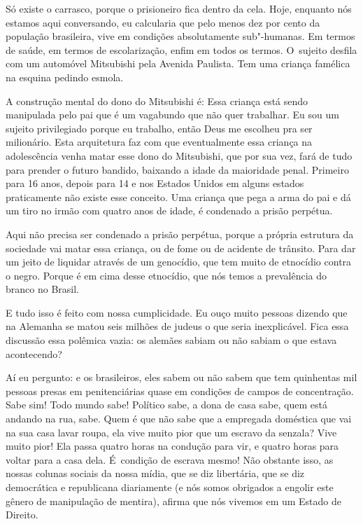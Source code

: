  

Só existe o carrasco, porque o prisioneiro fica dentro da cela. Hoje,
enquanto nós estamos aqui conversando, eu calcularia que pelo menos dez
por cento da população brasileira, vive em condições absolutamente
sub"-humanas. Em termos de saúde, em termos de escolarização, enfim em
todos os termos. O~sujeito desfila com um automóvel Mitsubishi pela
Avenida Paulista. Tem uma criança famélica na esquina pedindo esmola.

 

A construção mental do dono do Mitsubishi é: Essa criança está sendo
manipulada pelo pai que é um vagabundo que não quer trabalhar. Eu sou um
sujeito privilegiado porque eu trabalho, então Deus me escolheu pra ser
milionário. Esta arquitetura faz com que eventualmente essa criança na
adolescência venha matar esse dono do Mitsubishi, que por sua vez, fará
de tudo para prender o futuro bandido, baixando a idade da maioridade
penal. Primeiro para 16 anos, depois para 14 e nos Estados Unidos em
alguns estados praticamente não existe esse conceito. Uma criança que
pega a arma do pai e dá um tiro no irmão com quatro anos de idade, é
condenado a prisão perpétua.

 

Aqui não precisa ser condenado a prisão perpétua, porque a própria
estrutura da sociedade vai matar essa criança, ou de fome ou de acidente
de trânsito. Para dar um jeito de liquidar através de um genocídio, que
tem muito de etnocídio contra o negro. Porque é em cima desse etnocídio,
que nós temos a prevalência do branco no Brasil.

 

E tudo isso é feito com nossa cumplicidade. Eu ouço muito pessoas
dizendo que na Alemanha se matou seis milhões de judeus o que seria
inexplicável. Fica essa discussão essa polêmica vazia: os alemães sabiam
ou não sabiam o que estava acontecendo?

 

Aí eu pergunto: e os brasileiros, eles sabem ou não sabem que tem
quinhentas mil pessoas presas em penitenciárias quase em condições de
campos de concentração. Sabe sim! Todo mundo sabe! Político sabe, a dona
de casa sabe, quem está andando na rua, sabe. Quem é que não sabe que a
empregada doméstica que vai na sua casa lavar roupa, ela vive
muito pior que um escravo da senzala? Vive muito pior! Ela passa quatro
horas na condução para vir, e quatro horas para voltar para a casa dela.
É~condição de escrava mesmo! Não obstante isso, as nossas colunas
sociais da nossa mídia, que se diz libertária, que se diz democrática e
republicana diariamente (e nós somos obrigados a engolir este gênero de
manipulação de mentira), afirma que nós vivemos em um Estado de Direito.

